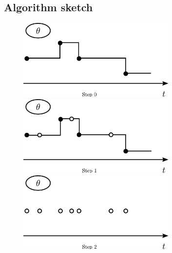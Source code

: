 \subsection{Algorithm sketch}
\setlength{\unitlength}{0.8cm}
  \begin{figure}[H]
  \centering
  \begin{minipage}[!hp]{0.45\linewidth}
  \centering
    \includegraphics [width=0.70\textwidth, angle=0]{figs/plotn0.pdf}
      \end{minipage}
  \begin{minipage}[!hp]{0.45\linewidth}
  \centering
    \includegraphics [width=0.70\textwidth, angle=0]{figs/plotn1.pdf}
    \vspace{-0 in}
  \end{minipage}
  \begin{minipage}[!hp]{0.45\linewidth}
  \centering
    \includegraphics [width=0.70\textwidth, angle=0]{figs/plotn2.pdf}
    \vspace{-0 in}
  \end{minipage}
  \begin{minipage}[!hp]{0.45\linewidth}

\end{minipage}
\end{figure}
